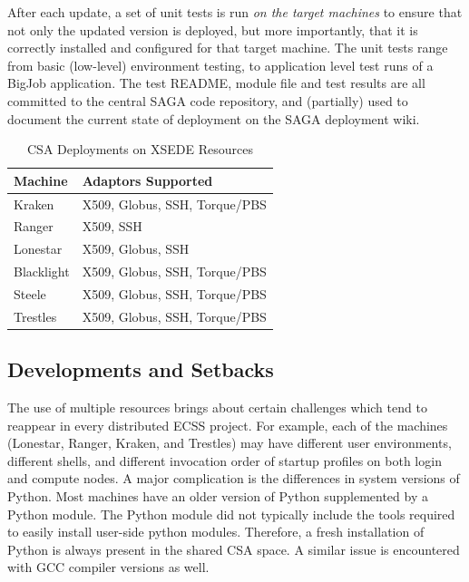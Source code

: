 \documentclass{sig-alternate}
\begin{document}
After each update, a set of unit tests is run \textit{on the
target machines} to ensure that not only the updated version is deployed, but
more importantly, that it is correctly installed and
configured for that target machine. The unit tests range from basic
(low-level) environment testing, to application level test runs of a
BigJob application. The test README, module file and test results
are all committed to the central SAGA code repository, and
(partially) used to document the current state of deployment on the
SAGA deployment wiki.

\begin{table}
\begin{center}
\begin{tabular}{ll}
\toprule
\textbf{Machine}  & 
\textbf{Adaptors Supported} 
\\ \midrule
Kraken   & 
X509, Globus, SSH, Torque/PBS
\\ \midrule
Ranger   & 
X509, SSH
\\ \midrule
Lonestar & 
X509, Globus, SSH
\\ \midrule
Blacklight & 
X509, Globus, SSH, Torque/PBS
\\ \midrule
Steele & 
X509, Globus, SSH, Torque/PBS
\\ \midrule
Trestles & 
X509, Globus, SSH, Torque/PBS
\\ \bottomrule
\end{tabular}
\caption{CSA Deployments on XSEDE Resources}
\label{table:CSA-Deployments}
\end{center}
\end{table}

\subsection{Developments and Setbacks}

The use of multiple resources brings about certain challenges which tend to reappear in 
every distributed ECSS project. For example, each of the machines (Lonestar, Ranger, 
Kraken, and Trestles) may have different user environments, different shells, and 
different invocation order of startup profiles on both login and compute nodes. A major 
complication is the differences in system versions of Python. Most machines have an older 
version of Python supplemented by a Python module. The Python module did not typically 
include the tools required to easily install user-side python modules. Therefore, a fresh 
installation of Python is always present in the shared CSA space. A similar issue is 
encountered with GCC compiler versions as well.
\end{document}
